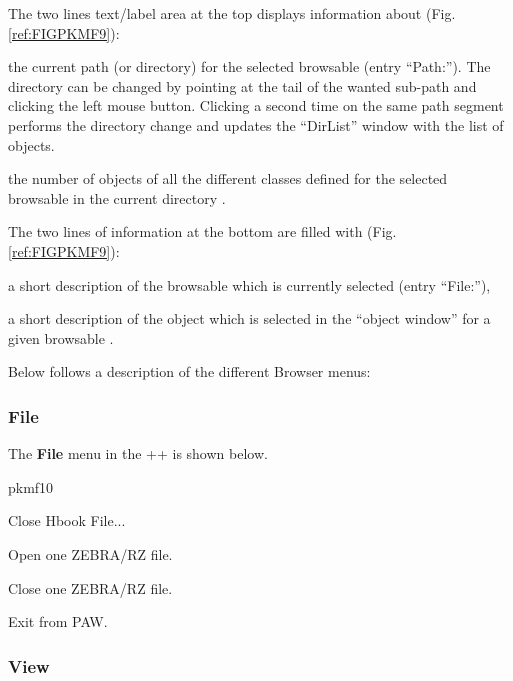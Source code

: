 The two lines text/label area at the top displays 
information about (Fig. \ref{ref:FIGPKMF9}):

\begin{UL}
\item 
the current path (or directory) for the selected browsable  
(entry ``Path:'').
The directory can be changed by pointing at the tail of the wanted sub-path 
and clicking the left mouse button. Clicking a second time on the same path 
segment performs the directory change and updates the ``DirList'' window 
with the list of objects.
\item
the number of objects of all the different classes defined 
for the selected browsable in the current directory .
\end{UL}

The two lines of information at the bottom are filled with 
(Fig. \ref{ref:FIGPKMF9}):

\begin{UL}
\item
a short description of the browsable which is currently selected 
 (entry ``File:''), 
\item
a short description of the object which is selected in the ``object 
window'' for a given browsable .
\end{UL}

Below follows a description of the different Browser menus:

\subsubsection*{File}

The \textbf{File} menu in the \PAW++{} \MB{} is shown below.

\begin{PICTf}[.25] {pkmf10}
\begin{DLsf}{Close Hbook File...}
\item[Open Hbook File...]
          Open one ZEBRA/RZ file. 
\item[Close Hbook File...]
          Close one ZEBRA/RZ file.
\item[Exit]
          Exit from PAW.
\end{DLsf}
\end{PICTf}

\subsubsection*{View}

